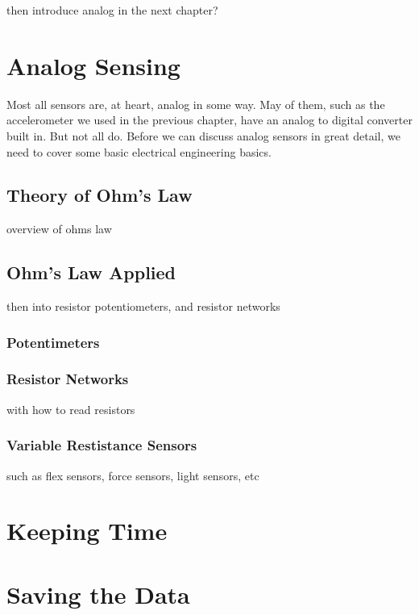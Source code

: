\documentclass[11pt]{book}
\begin{document}
then introduce analog in the next chapter?

\chapter{Analog Sensing}
Most all sensors are, at heart, analog in some way.  May of them, such as the accelerometer we used in the previous chapter, have an analog to digital converter built in.  But not all do.  Before we can discuss analog sensors in great detail, we need to cover some basic electrical engineering basics.

\section{Theory of Ohm's Law}
\label{sec:ohms}
overview of ohms law

\section{Ohm's Law Applied}
then into resistor potentiometers, and resistor networks
\subsection{Potentimeters}

\subsection{Resistor Networks}

with how to read resistors

\subsection{Variable Restistance Sensors}
such as flex sensors, force sensors, light sensors, etc

\chapter{Keeping Time}

\chapter{Saving the Data}
\end{document}
